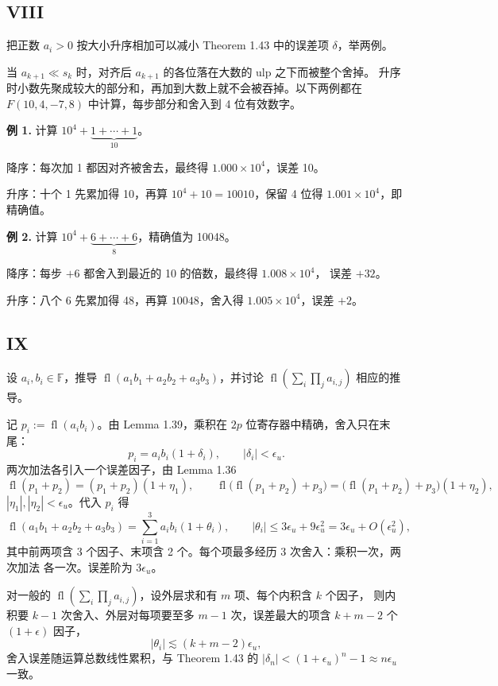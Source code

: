 \documentclass{article}
\newcommand{\fl}{\operatorname{fl}}
\newcommand{\F}{\mathbb{F}}
\begin{document}
\subsection*{VIII}

把正数 $a_i > 0$ 按大小升序相加可以减小 Theorem 1.43 中的误差项 $\delta$，举两例。

\begin{solution}
  当 $a_{k+1} \ll s_k$ 时，对齐后 $a_{k+1}$ 的各位落在大数的 ulp 之下而被整个舍掉。
  升序时小数先聚成较大的部分和，再加到大数上就不会被吞掉。以下两例都在
  $F(10, 4, -7, 8)$ 中计算，每步部分和舍入到 4 位有效数字。

  \textbf{例 1.} 计算 $10^{4} + \underbrace{1 + \cdots + 1}_{10}$。

  降序：每次加 1 都因对齐被舍去，最终得 $1.000 \times 10^{4}$，误差 10。

  升序：十个 1 先累加得 10，再算 $10^{4} + 10 = 10010$，保留 4 位得
  $1.001 \times 10^{4}$，即精确值。

  \textbf{例 2.} 计算 $10^{4} + \underbrace{6 + \cdots + 6}_{8}$，精确值为 10048。

  降序：每步 $+6$ 都舍入到最近的 10 的倍数，最终得 $1.008 \times 10^{4}$，
  误差 $+32$。

  升序：八个 6 先累加得 48，再算 $10048$，舍入得 $1.005 \times 10^{4}$，误差 $+2$。
\end{solution}

\subsection*{IX}

设 $a_i, b_i \in \F$，推导 $\fl(a_1 b_1 + a_2 b_2 + a_3 b_3)$，并讨论
$\fl(\sum_i \prod_j a_{i,j})$ 相应的推导。

\begin{solution}
  记 $p_i := \fl(a_i b_i)$。由 Lemma 1.39，乘积在 $2p$ 位寄存器中精确，舍入只在末尾：
  \[
    p_i = a_i b_i (1 + \delta_i), \qquad |\delta_i| < \epsilon_u.
  \]
  两次加法各引入一个误差因子，由 Lemma 1.36
  \[
    \fl(p_1 + p_2) = (p_1 + p_2)(1 + \eta_1), \qquad
    \fl\big(\fl(p_1 + p_2) + p_3\big) = \big(\fl(p_1 + p_2) + p_3\big)(1 + \eta_2),
  \]
  $|\eta_1|, |\eta_2| < \epsilon_u$。代入 $p_i$ 得
  \[
    \fl(a_1b_1 + a_2b_2 + a_3b_3)
    = \sum_{i=1}^{3} a_i b_i (1 + \theta_i),
    \qquad |\theta_i| \le 3\epsilon_u + 9\epsilon_u^{2} = 3\epsilon_u + O(\epsilon_u^2),
  \]
  其中前两项含 3 个因子、末项含 2 个。每个项最多经历 3 次舍入：乘积一次，两次加法
  各一次。误差阶为 $3\epsilon_u$。

  对一般的 $\fl(\sum_i \prod_j a_{i,j})$，设外层求和有 $m$ 项、每个内积含 $k$ 个因子，
  则内积要 $k - 1$ 次舍入、外层对每项要至多 $m - 1$ 次，误差最大的项含 $k + m - 2$ 个
  $(1 + \epsilon)$ 因子，
  \[
    |\theta_i| \lesssim (k + m - 2)\epsilon_u,
  \]
  舍入误差随运算总数线性累积，与 Theorem 1.43 的
  $|\delta_n| < (1 + \epsilon_u)^n - 1 \approx n\epsilon_u$ 一致。
\end{solution}
\end{document}
